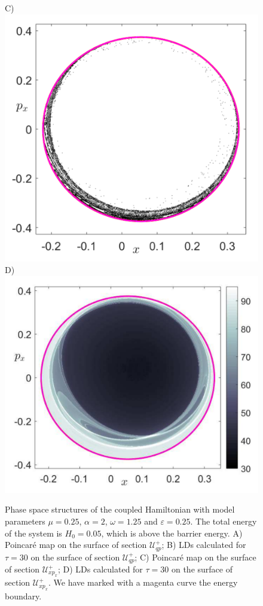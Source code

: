 \documentclass{ws-ijbc}
\begin{document}
\begin{figure}[!ht]
\begin{center}
		C)\includegraphics[scale=0.42]{fig12c}
		D)\includegraphics[scale=0.42]{fig12d}
	\end{center}

	\caption{Phase space structures of the coupled Hamiltonian with model parameters $\mu = 0.25$, $\alpha = 2$, $\omega = 1.25$ and $\varepsilon = 0.25$. The total energy of the system is $H_0 = 0.05$,	which is above the barrier energy. A) Poincar\'e map on the surface of section $\mathcal{U}^{+}_{qp}$; B) LDs calculated for $\tau = 30$ on the surface of section $\mathcal{U}^{+}_{qp}$; C) Poincar\'e map on the surface of section $\mathcal{U}^{+}_{xp_x}$; D) LDs calculated for $\tau = 30$ on the surface of section $\mathcal{U}^{+}_{xp_x}$. We have marked with a magenta curve the energy boundary.}
	\label{ps_vs_ld_2}
\end{figure}
\end{document}
